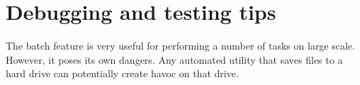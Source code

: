 \documentclass[letterpaper,12pt,english,openany,oneside]{sphinxmanual}
\begin{document}
\begin{sphinxVerbatim}[commandchars=\\\{\}]
         
                
            
      
\end{sphinxVerbatim}


\section{Debugging and testing tips}
\label{\detokenize{index:debugging-and-testing-tips}}
The batch feature is very useful for performing a number of tasks on large scale. However, it poses its own dangers. Any automated utility that saves files to a hard drive can potentially create havoc on that drive.
\end{document}
